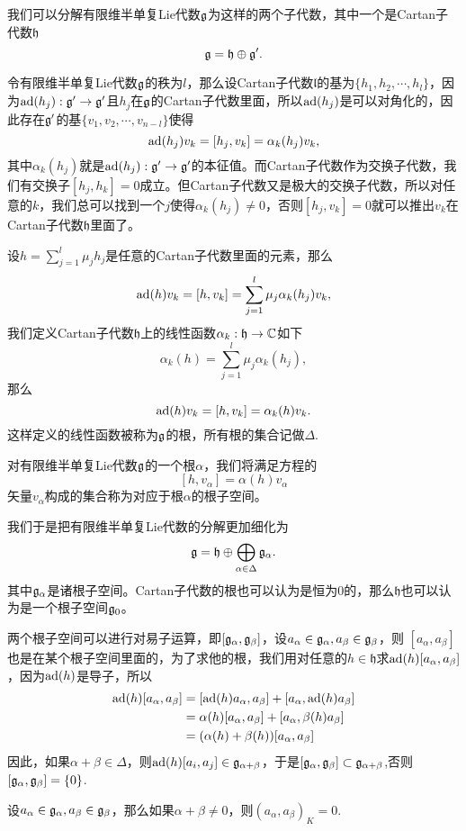 我们可以分解有限维半单复Lie代数${\mathfrak{g}}$为这样的两个子代数，其中一个是Cartan子代数$\mathfrak{h}$
\[
	{\mathfrak{g}}=\mathfrak{h}\oplus {\mathfrak{g}}'.
\]

令有限维半单复Lie代数${\mathfrak{g}}$的秩为$l$，那么设Cartan子代数$\mathfrak{l}$的基为$\{h_1,h_2,\cdots,h_l\}$，因为${\mathrm{ad}}(h_j):{\mathfrak{g}}'\to {\mathfrak{g}}'$且$h_j$在${\mathfrak{g}}$的Cartan子代数里面，所以${\mathrm{ad}}(h_j)$是可以对角化的，因此存在${\mathfrak{g}}'$的基$\{v_1,v_2,\cdots,v_{n-l}\}$使得
\[
	{\mathrm{ad}}(h_j)v_k=[h_j,v_k]=\alpha_{k}(h_j)v_k,
\]
其中$\alpha_{k}(h_j)$就是${\mathrm{ad}}(h_j):{\mathfrak{g}}'\to {\mathfrak{g}}'$的本征值。而Cartan子代数作为交换子代数，我们有交换子$[h_j,h_k]=0$成立。但Cartan子代数又是极大的交换子代数，所以对任意的$k$，我们总可以找到一个$j$使得$\alpha_{k}(h_j)\neq 0$，否则$[h_j,v_k]=0$就可以推出$v_k$在Cartan子代数$\mathfrak{h}$里面了。

设$h=\sum_{j=1}^l\mu_jh_j$是任意的Cartan子代数里面的元素，那么
\[
	{\mathrm{ad}}(h)v_k=[h,v_k]=\sum_{j=1}^l\mu_j\alpha_{k}(h_j)v_k,
\]
我们定义Cartan子代数$\mathfrak{h}$上的线性函数$\alpha_{k}:\mathfrak{h}\to\mathbb{C}$如下
\[
\alpha_{k}(h)=\sum_{j=1}^l\mu_j\alpha_{k}(h_j),
\]
那么
\[
	{\mathrm{ad}}(h)v_k=[h,v_k]=\alpha_{k}(h)v_k.
\]
这样定义的线性函数被称为${\mathfrak{g}}$的根，所有根的集合记做$\Delta$.

\para 对有限维半单复Lie代数${\mathfrak{g}}$的一个根$\alpha$，我们将满足方程的
\[
[h,v_\alpha]=\alpha(h)v_\alpha
\]
矢量$v_\alpha$构成的集合称为对应于根$\alpha$的根子空间。

我们于是把有限维半单复Lie代数的分解更加细化为
\[
	{\mathfrak{g}}=\mathfrak{h}\oplus \bigoplus_{\alpha\in\Delta} {\mathfrak{g}}_\alpha.
\]
其中${\mathfrak{g}}_\alpha$是诸根子空间。Cartan子代数的根也可以认为是恒为0的，那么$\mathfrak{h}$也可以认为是一个根子空间${\mathfrak{g}}_0$。

两个根子空间可以进行对易子运算，即$[{\mathfrak{g}}_\alpha,{\mathfrak{g}}_\beta]$，设$a_\alpha\in{\mathfrak{g}}_\alpha,a_\beta\in{\mathfrak{g}}_\beta$，则
$[a_\alpha,a_\beta]$也是在某个根子空间里面的，为了求他的根，我们用对任意的$h\in \mathfrak{h}$求${\mathrm{ad}}(h)[a_\alpha,a_\beta]$，因为${\mathrm{ad}}(h)$是导子，所以
\[
	\begin{split}
		{\mathrm{ad}}(h)[a_\alpha,a_\beta]&=[{\mathrm{ad}}(h)a_\alpha,a_\beta]+[a_\alpha,{\mathrm{ad}}(h)a_\beta]\\
		&=\alpha(h)[a_\alpha,a_\beta]+[a_\alpha,\beta(h)a_\beta]\\
		&=(\alpha(h)+\beta(h))[a_\alpha,a_\beta]
	\end{split}
\]
因此，如果$\alpha+\beta\in\Delta$，则${\mathrm{ad}}(h)[a_i,a_j]\in {\mathfrak{g}}_{\alpha+\beta}$，于是$[{\mathfrak{g}}_\alpha,{\mathfrak{g}}_\beta]\subset {\mathfrak{g}}_{\alpha+\beta}$,否则$[{\mathfrak{g}}_\alpha,{\mathfrak{g}}_\beta]=\{0\}$.

\theo 设$a_\alpha\in{\mathfrak{g}}_\alpha,a_\beta\in{\mathfrak{g}}_\beta$，那么如果$\alpha+\beta\neq 0$，则$(a_\alpha,a_\beta)_K=0$.

